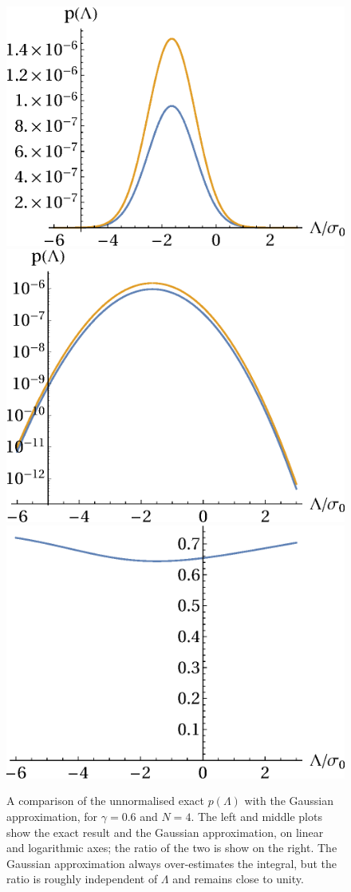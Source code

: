 \documentclass[12pt]{article}
\begin{document}
\begin{figure} 
  \centering
  \includegraphics[width=.45 \linewidth]{PLam_approx.eps} \hfill
   \includegraphics[width=.45 \linewidth]{PLam_approx_log.eps} \hfill \\
    \includegraphics[width=.45 \linewidth]{PLam_ratio.eps}
  \caption{    A comparison of the unnormalised exact $p(\Lambda)$ with the Gaussian approximation, for $\gamma=0.6$ and $N=4$. The left and middle plots show the exact result and the Gaussian approximation, on linear and logarithmic axes; the ratio of the two is show on the right. The Gaussian approximation always  over-estimates the integral, but the ratio is roughly independent of $\Lambda$ and remains close to unity.}
  \label{Comparison}
\end{figure}
\end{document}
